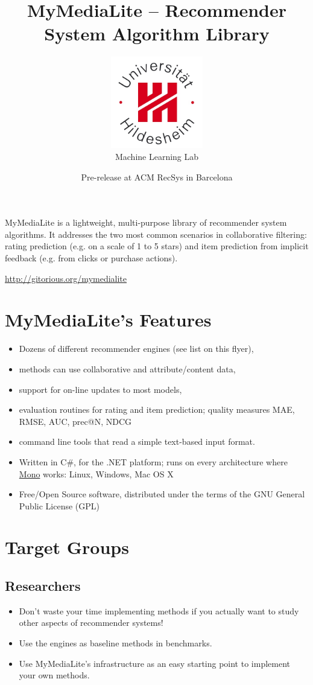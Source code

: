\documentclass[a4paper, foldmark, 12pt]{leaflet}
\title{MyMediaLite -- Recommender System Algorithm Library}
\author{
	\includegraphics[width=4.0cm]{fig/uni-hildesheim-400x400.jpg}\\
	Machine Learning Lab
}
\date{Pre-release at ACM RecSys in Barcelona}
\begin{document}
\maketitle


MyMediaLite is a lightweight, multi-purpose library
of recommender system algorithms.
It addresses the two most common scenarios in collaborative filtering:
rating prediction (e.g. on a scale of 1 to 5 stars)
and item prediction from implicit feedback (e.g. from clicks or purchase actions).

\begin{center}
	\url{http://gitorious.org/mymedialite}
\end{center}

\newpage

\section{MyMediaLite's Features}

\begin{itemize}
	\item Dozens of different recommender engines (see list on this flyer),
	\item methods can use collaborative and attribute/content data,
	\item support for on-line updates to most models,
	\item evaluation routines for rating and item prediction;
	      quality measures MAE, RMSE, AUC, prec@N, NDCG
	\item command line tools that read a simple text-based input format.
	\item Written in C\#, for the .NET platform;
	      runs on every architecture where \href{www.mono-project.com}{Mono} works:
	      Linux, Windows, Mac OS X
	\item Free/Open Source software, distributed under the terms of the
	      GNU General Public License (GPL)
\end{itemize}

\newpage

\section{Target Groups}

\subsection{Researchers}
\begin{itemize}
	\item Don't waste your time implementing methods
	      if you actually want to study
	      other aspects of recommender systems!
	\item Use the engines as baseline methods in benchmarks.
	\item Use MyMediaLite's infrastructure as an easy
	      starting point to implement your own methods.
\end{itemize}
\end{document}
